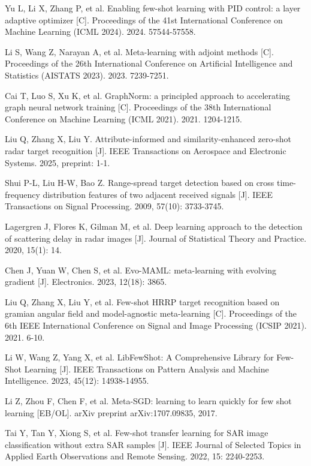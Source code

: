 \documentclass[doctor,twoside,ttf]{nudtpaper}
\begin{document}
\begin{thebibliography}{99}
 Yu L, Li X, Zhang P, et al. Enabling few-shot learning with PID control: a layer adaptive optimizer [C]. Proceedings of the 41st International Conference on Machine Learning (ICML 2024). 2024. 57544-57558.

 Li S, Wang Z, Narayan A, et al. Meta-learning with adjoint methods [C]. Proceedings of the 26th International Conference on Artificial Intelligence and Statistics (AISTATS 2023). 2023. 7239-7251.

 Cai T, Luo S, Xu K, et al. GraphNorm: a principled approach to accelerating graph neural network training [C]. Proceedings of the 38th International Conference on Machine Learning (ICML 2021). 2021. 1204-1215.

 Liu Q, Zhang X, Liu Y. Attribute-informed and similarity-enhanced zero-shot radar target recognition [J]. IEEE Transactions on Aerospace and Electronic Systems. 2025, preprint: 1-1.

 Shui P-L, Liu H-W, Bao Z. Range-spread target detection based on cross time-frequency distribution features of two adjacent received signals [J]. IEEE Transactions on Signal Processing. 2009, 57(10): 3733-3745.

 Lagergren J, Flores K, Gilman M, et al. Deep learning approach to the detection of scattering delay in radar images [J]. Journal of Statistical Theory and Practice. 2020, 15(1): 14.

 Chen J, Yuan W, Chen S, et al. Evo-MAML: meta-learning with evolving gradient [J]. Electronics. 2023, 12(18): 3865.

 Liu Q, Zhang X, Liu Y, et al. Few-shot HRRP target recognition based on gramian angular field and model-agnostic meta-learning [C]. Proceedings of the 6th IEEE International Conference on Signal and Image Processing (ICSIP 2021). 2021. 6-10.

 Li W, Wang Z, Yang X, et al. LibFewShot: A Comprehensive Library for Few-Shot Learning [J]. IEEE Transactions on Pattern Analysis and Machine Intelligence. 2023, 45(12): 14938-14955.

 Li Z, Zhou F, Chen F, et al. Meta-SGD: learning to learn quickly for few shot learning [EB/OL]. arXiv preprint arXiv:1707.09835, 2017.

 Tai Y, Tan Y, Xiong S, et al. Few-shot transfer learning for SAR image classification without extra SAR samples [J]. IEEE Journal of Selected Topics in Applied Earth Observations and Remote Sensing. 2022, 15: 2240-2253.


\end{thebibliography}
\end{document}
